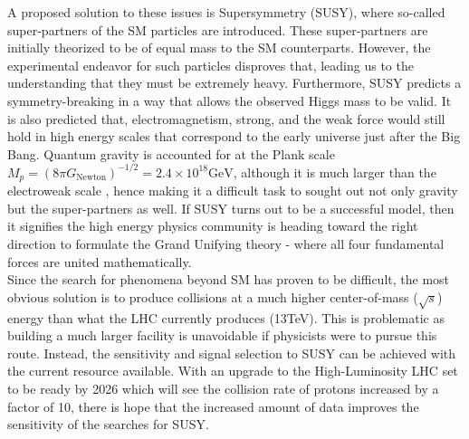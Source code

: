 A proposed solution to these issues is Supersymmetry (SUSY), where so-called super-partners of the SM particles are introduced. These super-partners are initially theorized to be of equal mass to the SM counterparts. However, the experimental endeavor for such particles disproves that, leading us to the understanding that they must be extremely heavy. Furthermore, SUSY predicts a symmetry-breaking in a way that allows the observed Higgs mass to be valid. It is also predicted that, electromagnetism, strong, and the weak force would still hold in high energy scales that correspond to the early universe just after the Big Bang. Quantum gravity is accounted for at the Plank scale $ M_p = (8\pi G_{\text{Newton}})^{-1/2} = 2.4 \times 10^{18} \text{GeV} $, although it is much larger than the electroweak scale \cite{martin1997supersymmetry}, hence making it a difficult task to sought out not only gravity but the super-partners as well. If SUSY turns out to be a successful model, then it signifies the high energy physics community is heading toward the right direction to formulate the Grand Unifying theory - where all four fundamental forces are united mathematically. \\

Since the search for phenomena beyond SM has proven to be difficult, the most obvious solution is to produce collisions at a much higher center-of-mass ($\sqrt{s}$) energy than what the LHC currently produces (13TeV). This is problematic as building a much larger facility is unavoidable if physicists were to pursue this route. Instead, the sensitivity and signal selection to SUSY can be achieved with the current resource available. With an upgrade to the High-Luminosity LHC set to be ready by 2026 \cite{apollinari2015high, apollinari2017high} which will see the collision rate of protons increased by a factor of 10, there is hope that the increased amount of data improves the sensitivity of the searches for SUSY. \\

